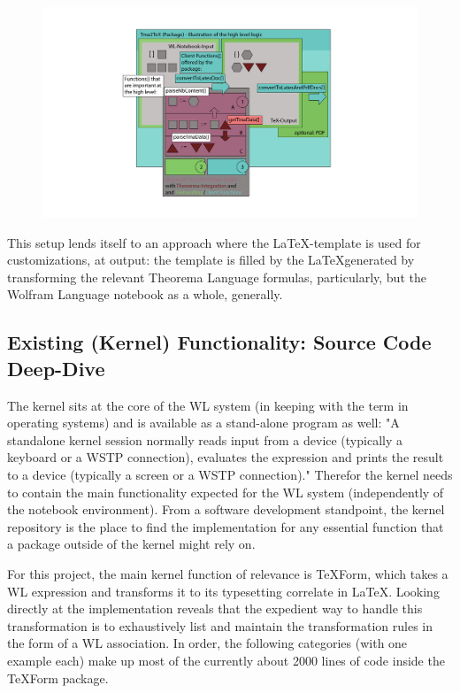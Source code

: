 \begin{figure}[h]
    \centering
    \includegraphics[scale=.35]{images/concept/Tma2Tex-Logic-01.png}
    \caption{}
    \label{fig:package-logic}
\end{figure}

This setup lends itself to an approach where the \LaTeX-template is used for customizations, at output: the template is filled by the \LaTeX generated by transforming the relevant Theorema Language formulas, particularly, but the Wolfram Language notebook as a whole, generally.

\subsection{Existing (Kernel) Functionality: Source Code Deep-Dive} \label{concept:existing-functionality}

The kernel sits at the core of the WL system (in keeping with the term in operating systems) and is available as a stand-alone program as well: "A standalone kernel session normally reads input from a device (typically a keyboard or a WSTP \cite{wolfram_research_inc_wstp_2024} connection), evaluates the expression and prints the result to a device (typically a screen or a WSTP connection)." \cite{wolfram_research_inc_wolframkernelwolfram_2024} Therefor the kernel needs to contain the main functionality expected for the WL system (independently of the notebook environment). From a software development standpoint, the kernel repository is the place to find the implementation for any essential function that a package outside of the kernel might rely on.

For this project, the main kernel function of relevance is TeXForm, which takes a WL expression and transforms it to its typesetting correlate in \LaTeX. Looking directly at the implementation reveals that the expedient way to handle this transformation is to exhaustively list and maintain the transformation rules in the form of a WL association. In order, the following categories (with one example each) make up most of the currently about 2000 lines of code inside the TeXForm package.

